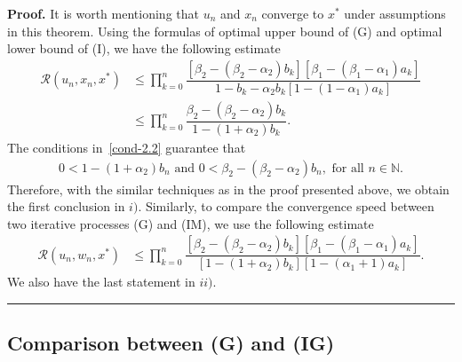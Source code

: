 \documentclass[a4paper, 11pt]{article}
\newenvironment{proof}[1][Proof]{\textbf{#1.} }{\hfill\rule{0.5em}{0.5em}}
\begin{document}
\begin{proof}
It is worth mentioning that $u_n$ and $x_n$ converge to $x^*$ under assumptions in this theorem. Using the formulas of optimal upper bound of (G) and optimal lower bound of (I), we have the following estimate
\begin{align*}
\mathcal{R}(u_n,x_n,x^*) & \le \prod_{k=0}^n \dfrac{\left[\beta_2-(\beta_2-\alpha_2)b_k\right]\left[\beta_1-(\beta_1-\alpha_1)a_k\right]}{1 - b_k - \alpha_2b_k[1 - (1-\alpha_1)a_k]} \\
& \le \prod_{k=0}^n \dfrac{\beta_2-(\beta_2-\alpha_2)b_k}{1 - (1+\alpha_2)b_k}.
\end{align*}
The conditions in~\eqref{cond-2.2} guarantee that \begin{align*}
	0< 1-(1+\alpha_2)b_n \text{ and } 0< \beta_2 - (\beta_2 - \alpha_2) b_n, \text{ for all } n \in \mathbb{N}.
\end{align*} 
Therefore, with the similar techniques as in the proof presented above, we obtain the first conclusion in $i)$. Similarly, to compare the convergence speed between two iterative processes (G) and (IM), we use the following estimate
\begin{align*}
\mathcal{R}(u_n,w_n,x^*) &\leq \prod_{k=0}^n \dfrac{\left[\beta_2-(\beta_2-\alpha_2)b_k\right]\left[\beta_1-(\beta_1-\alpha_1)a_k\right]}{[1 - (1+\alpha_2)b_k][1 - (\alpha_1 + 1)a_k]}.
\end{align*}
We also have the last statement in $ii)$.
\end{proof}


\subsection{Comparison between (G) and (IG)}
\end{document}
